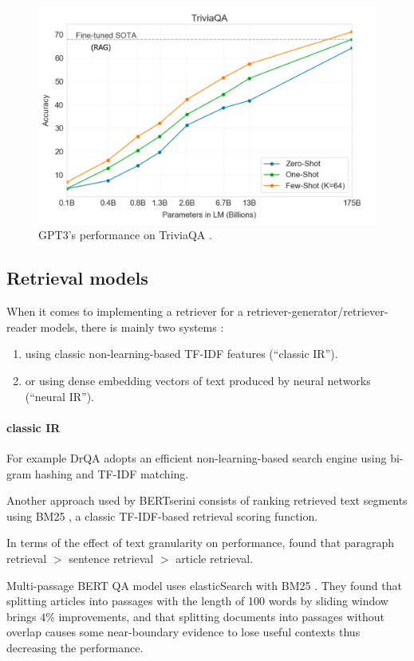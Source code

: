 \documentclass[a4paper,12pt]{article}
\begin{document}
\begin{figure}
	\centering
	\includegraphics[width=0.8\linewidth]{figures/gpt3-triviaqa.png}
	\caption{GPT3's performance on TriviaQA \cite{triviaqa}. \cite{gpt3}}
	\label{fig:gpt3}
\end{figure}

\subsection{Retrieval models}
When it comes to implementing a retriever for a retriever-generator/retriever-reader models, there is mainly two systems : 
\begin{enumerate}
	\item using classic non-learning-based TF-IDF features (“classic IR”).
	\item or using dense embedding vectors of text produced by neural networks (“neural IR”).
\end{enumerate}

\paragraph{classic IR}
For example DrQA \cite{drqa} adopts an efficient non-learning-based search engine using bi-gram hashing
and TF-IDF matching.

Another approach used by BERTserini \cite{BERTserini} consists of ranking retrieved text segments using BM25 \cite{BM25}, a classic TF-IDF-based retrieval scoring function.

In terms of the effect of text granularity on performance, \cite{BERTserini} found that paragraph retrieval $>$ sentence retrieval $>$ article retrieval.

Multi-passage BERT QA model \cite{multibert} uses elasticSearch with BM25 \cite{BM25}. They found that splitting articles into passages with the length of 100 words by sliding window brings $4\%$ improvements, and that splitting documents into passages without overlap causes some near-boundary evidence to lose useful contexts thus decreasing the performance.
\end{document}

